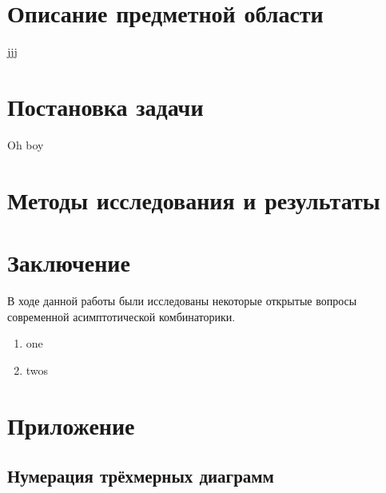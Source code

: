 \documentclass[12pt]{report}
\begin{document}
\chapter{Описание предметной области}

jjj

\chapter{Постановка задачи}
Oh boy



\newpage
\chapter{Методы исследования и результаты}


\newpage

\chapter{Заключение}
\hspace{\parindent} В ходе данной работы были исследованы некоторые открытые вопросы современной асимптотической комбинаторики. 
\begin{enumerate}
\item one
\item twos

\end{enumerate}
 

\newpage
\chapter{Приложение}
\section{Нумерация трёхмерных диаграмм}
\end{document}
